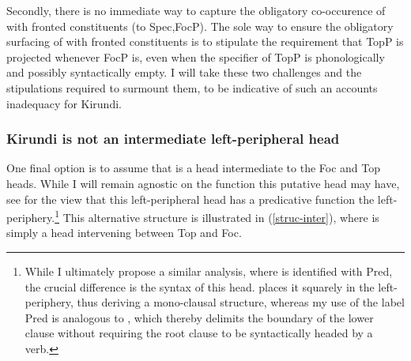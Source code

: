 \documentclass[12pt]{article}
\begin{document}
\bex
\ex {} \label{predict-top1}
\bxl
{}  \label{predict-top1a}
  \label{predict-top1b}
\fxl
\ex {}
\bxl
{}  \label{predict-top1c}
  \label{predict-top1d}
\fxl
\fex

Secondly, there is no immediate way to capture the obligatory co-occurence of  with fronted constituents (to Spec,FocP). The sole way to ensure the obligatory surfacing of  with fronted constituents is to stipulate the requirement that TopP is projected whenever FocP is, even when the specifier of TopP is phonologically and possibly syntactically empty. I will take these two challenges and the stipulations required to surmount them, to be indicative of such an accounts inadequacy for Kirundi. 


\subsubsection{Kirundi  is not an intermediate left-peripheral head}

One final option is to assume that  is a head intermediate to the Foc and Top heads. While I will remain agnostic on the function this putative head may have, see \citet{wasike-2007} for the view that this left-peripheral head has a predicative function  the left-periphery.\footnote{While I ultimately propose a similar analysis, where  is identified with Pred, the crucial difference is the syntax of this head. \citet{wasike-2007} places it squarely in the left-periphery, thus deriving a mono-clausal structure, whereas my use of the label Pred is analogous to , which thereby delimits the boundary of the lower clause without requiring the root clause to be syntactically headed by a verb.} This alternative structure is illustrated in (\ref{struc-inter}), where  is simply a head intervening between Top and Foc. 
\end{document}
